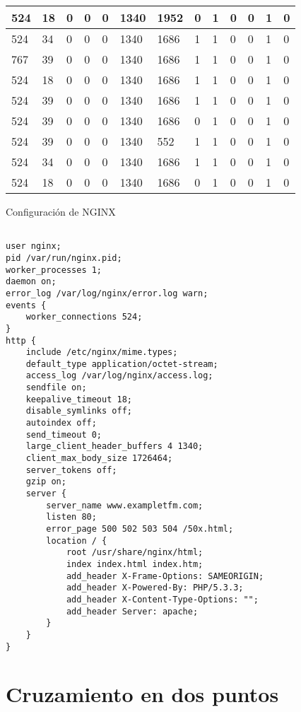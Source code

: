 \begin{table}[H]
\begin{tabular}{|l|l|l|l|l|l|l|l|l|l|l|l|l|}
524  &  18  &  0  &  0  &  0  &  1340  &  1952  &  0  &  1  &  0  &  0  &  1  &  0 \\ \hline
524  &  34  &  0  &  0  &  0  &  1340  &  1686  &  1  &  1  &  0  &  0  &  1  &  0 \\ \hline
767  &  39  &  0  &  0  &  0  &  1340  &  1686  &  1  &  1  &  0  &  0  &  1  &  0 \\ \hline
524  &  18  &  0  &  0  &  0  &  1340  &  1686  &  1  &  1  &  0  &  0  &  1  &  0 \\ \hline
524  &  39  &  0  &  0  &  0  &  1340  &  1686  &  1  &  1  &  0  &  0  &  1  &  0 \\ \hline
524  &  39  &  0  &  0  &  0  &  1340  &  1686  &  0  &  1  &  0  &  0  &  1  &  0 \\ \hline
524  &  39  &  0  &  0  &  0  &  1340  &  552  &  1  &  1  &  0  &  0  &  1  &  0 \\ \hline
524  &  34  &  0  &  0  &  0  &  1340  &  1686  &  1  &  1  &  0  &  0  &  1  &  0 \\ \hline
524  &  18  &  0  &  0  &  0  &  1340  &  1686  &  0  &  1  &  0  &  0  &  1  &  0 \\ \hline
\end{tabular}
\end{table}
Configuración de NGINX
\begin{lstlisting}[label={lst:nginx_config_random},caption={Configuración de NGINX tras 20 generaciones}]

user nginx;
pid /var/run/nginx.pid;
worker_processes 1;
daemon on;
error_log /var/log/nginx/error.log warn;
events {
    worker_connections 524;
}
http {
    include /etc/nginx/mime.types;
    default_type application/octet-stream;
    access_log /var/log/nginx/access.log;
    sendfile on;
    keepalive_timeout 18;
    disable_symlinks off;
    autoindex off;
    send_timeout 0;
    large_client_header_buffers 4 1340;
    client_max_body_size 1726464;
    server_tokens off;
    gzip on;
    server {
        server_name www.exampletfm.com;
        listen 80;
        error_page 500 502 503 504 /50x.html;
        location / {
            root /usr/share/nginx/html;
            index index.html index.htm;
            add_header X-Frame-Options: SAMEORIGIN;
            add_header X-Powered-By: PHP/5.3.3;
            add_header X-Content-Type-Options: "";
            add_header Server: apache;
        }
    }
}
\end{lstlisting}


\section{Cruzamiento en dos puntos}

